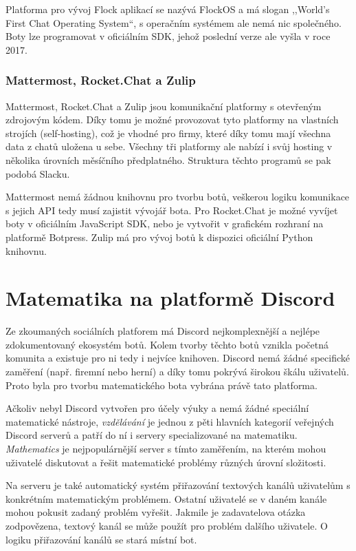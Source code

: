 \documentclass[FM]{tulthesis}
\begin{document}
	Platforma pro vývoj Flock aplikací se nazývá FlockOS a má slogan ,,World's First Chat Operating System``, s operačním systémem ale nemá nic společného. Boty lze programovat v oficiálním SDK, jehož poslední verze ale vyšla v roce 2017.
	
	\subsection{Mattermost, Rocket.Chat a Zulip}
	
	Mattermost, Rocket.Chat a Zulip jsou komunikační platformy s otevřeným zdrojovým kódem. Díky tomu je možné provozovat tyto platformy na vlastních strojích (self-hosting), což je vhodné pro firmy, které díky tomu mají všechna data z chatů uložena u sebe. Všechny tři platformy ale nabízí i svůj hosting v několika úrovních měsíčního předplatného. Struktura těchto programů se pak podobá Slacku.
	
	Mattermost nemá žádnou knihovnu pro tvorbu botů, veškerou logiku komunikace s jejich API tedy musí zajistit vývojář bota. Pro Rocket.Chat je možné vyvíjet boty v oficiálním JavaScript SDK, nebo je vytvořit v grafickém rozhraní na platformě Botpress. Zulip má pro vývoj botů k dispozici oficiální Python knihovnu.
		
	\chapter{Matematika na platformě Discord}
	
	Ze zkoumaných sociálních platforem má Discord nejkomplexnější a nejlépe zdokumentovaný ekosystém botů. Kolem tvorby těchto botů vznikla početná komunita a existuje pro ni tedy i nejvíce knihoven. Discord nemá žádné specifické zaměření (např. firemní nebo herní) a díky tomu pokrývá širokou škálu uživatelů. Proto byla pro tvorbu matematického bota vybrána právě tato platforma.
	
	Ačkoliv nebyl Discord vytvořen pro účely výuky a nemá žádné speciální matematické nástroje, \textit{vzdělávání} je jednou z pěti hlavních kategorií veřejných Discord serverů a patří do ní i servery specializované na matematiku. \textit{Mathematics} je nejpopulárnější server s tímto zaměřením, na kterém mohou uživatelé diskutovat a řešit matematické problémy různých úrovní složitosti.
	
	Na serveru je také automatický systém přiřazování textových kanálů uživatelům s konkrétním matematickým problémem. Ostatní uživatelé se v daném kanále mohou pokusit zadaný problém vyřešit. Jakmile je zadavatelova otázka zodpovězena, textový kanál se může použít pro problém dalšího uživatele. O logiku přiřazování kanálů se stará místní bot.
	
\end{document}
